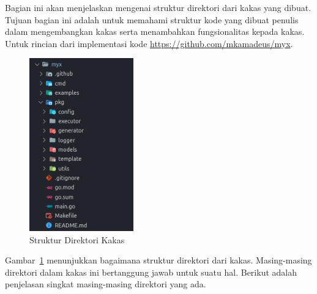 Bagian ini akan menjelaskan mengenai struktur direktori dari kakas yang dibuat.
Tujuan bagian ini adalah untuk memahami struktur kode yang dibuat penulis dalam mengembangkan kakas serta menambahkan fungsionalitas kepada kakas.
Untuk rincian dari implementasi kode \url{https://github.com/mkamadeus/myx}.

\begin{figure}[ht]
    \vspace{\baselineskip}
    \centering
    \includegraphics[width=0.4\textwidth]{resources/images/chapter-4/04-directory.png}
    \caption{Struktur Direktori Kakas}\label{fig:04-directory}
\end{figure}

Gambar~\ref{fig:04-directory} menunjukkan bagaimana struktur direktori dari kakas.
Masing-masing direktori dalam kakas ini bertanggung jawab untuk suatu hal.
Berikut adalah penjelasan singkat masing-masing direktori yang ada.

